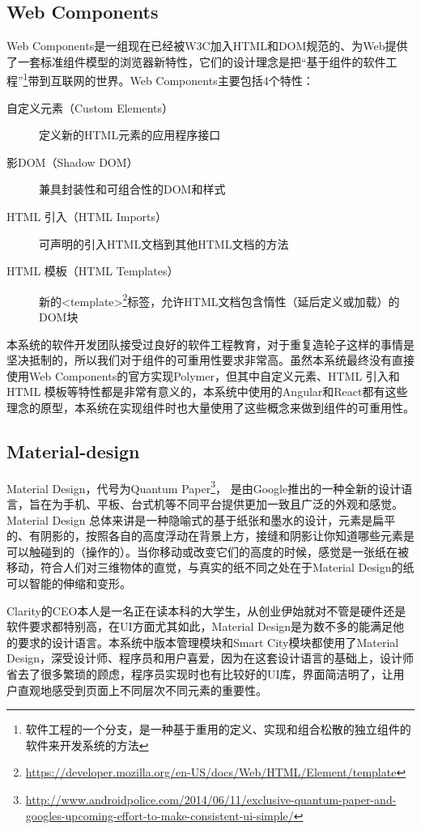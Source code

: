 \subsection{Web Components}
Web Components是一组现在已经被W3C加入HTML和DOM规范的、为Web提供了一套标准组件模型的浏览器新特性，它们的设计理念是把“基于组件的软件工程”\footnote{软件工程的一个分支，是一种基于重用的定义、实现和组合松散的独立组件的软件来开发系统的方法}带到互联网的世界。Web Components主要包括4个特性：
\begin{description}
  \item[自定义元素（Custom Elements）] 定义新的HTML元素的应用程序接口
  \item[影DOM（Shadow DOM）] 兼具封装性和可组合性的DOM和样式
  \item[HTML 引入（HTML Imports）] 可声明的引入HTML文档到其他HTML文档的方法
  \item[HTML 模板（HTML Templates）] 新的<template>\footnote{\url{https://developer.mozilla.org/en-US/docs/Web/HTML/Element/template}}标签，允许HTML文档包含惰性（延后定义或加载）的DOM块
\end{description}

本系统的软件开发团队接受过良好的软件工程教育，对于重复造轮子这样的事情是坚决抵制的，所以我们对于组件的可重用性要求非常高。虽然本系统最终没有直接使用Web Components的官方实现Polymer，但其中自定义元素、HTML 引入和HTML 模板等特性都是非常有意义的，本系统中使用的Angular和React都有这些理念的原型，本系统在实现组件时也大量使用了这些概念来做到组件的可重用性。

\subsection{Material-design}
Material Design，代号为Quantum Paper\footnote{\url{http://www.androidpolice.com/2014/06/11/exclusive-quantum-paper-and-googles-upcoming-effort-to-make-consistent-ui-simple/}}， 是由Google推出的一种全新的设计语言，旨在为手机、平板、台式机等不同平台提供更加一致且广泛的外观和感觉。Material Design 总体来讲是一种隐喻式的基于纸张和墨水的设计，元素是扁平的、有阴影的，按照各自的高度浮动在背景上方，接缝和阴影让你知道哪些元素是可以触碰到的（操作的）。当你移动或改变它们的高度的时候，感觉是一张纸在被移动，符合人们对三维物体的直觉，与真实的纸不同之处在于Material Design的纸可以智能的伸缩和变形。

Clarity的CEO本人是一名正在读本科的大学生，从创业伊始就对不管是硬件还是软件要求都特别高，在UI方面尤其如此，Material Design是为数不多的能满足他的要求的设计语言。本系统中版本管理模块和Smart City模块都使用了Material Design，深受设计师、程序员和用户喜爱，因为在这套设计语言的基础上，设计师省去了很多繁琐的顾虑，程序员实现时也有比较好的UI库，界面简洁明了，让用户直观地感受到页面上不同层次不同元素的重要性。

